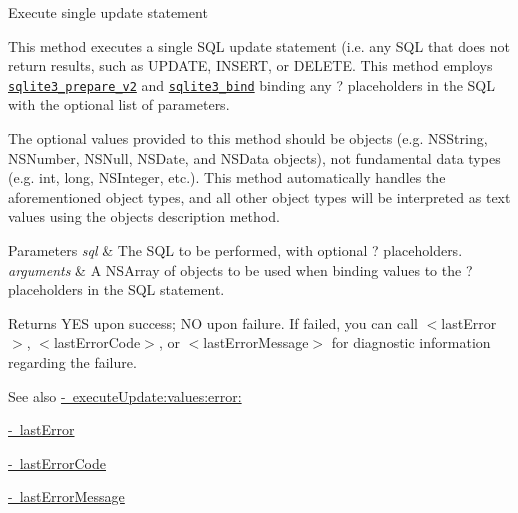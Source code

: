 Execute single update statement

This method executes a single S\+QL update statement (i.\+e. any S\+QL that does not return results, such as {\ttfamily U\+P\+D\+A\+TE}, {\ttfamily I\+N\+S\+E\+RT}, or {\ttfamily D\+E\+L\+E\+TE}. This method employs \href{http://sqlite.org/c3ref/prepare.html}{\tt {\ttfamily sqlite3\+\_\+prepare\+\_\+v2}} and \href{http://sqlite.org/c3ref/bind_blob.html}{\tt {\ttfamily sqlite3\+\_\+bind}} binding any {\ttfamily ?} placeholders in the S\+QL with the optional list of parameters.

The optional values provided to this method should be objects (e.\+g. {\ttfamily N\+S\+String}, {\ttfamily N\+S\+Number}, {\ttfamily N\+S\+Null}, {\ttfamily N\+S\+Date}, and {\ttfamily N\+S\+Data} objects), not fundamental data types (e.\+g. {\ttfamily int}, {\ttfamily long}, {\ttfamily N\+S\+Integer}, etc.). This method automatically handles the aforementioned object types, and all other object types will be interpreted as text values using the object\textquotesingle{}s {\ttfamily description} method.


\begin{DoxyParams}{Parameters}
{\em sql} & The S\+QL to be performed, with optional {\ttfamily ?} placeholders.\\
\hline
{\em arguments} & A {\ttfamily N\+S\+Array} of objects to be used when binding values to the {\ttfamily ?} placeholders in the S\+QL statement.\\
\hline
\end{DoxyParams}
\begin{DoxyReturn}{Returns}
{\ttfamily Y\+ES} upon success; {\ttfamily NO} upon failure. If failed, you can call {\ttfamily $<$last\+Error$>$}, {\ttfamily $<$last\+Error\+Code$>$}, or {\ttfamily $<$last\+Error\+Message$>$} for diagnostic information regarding the failure.
\end{DoxyReturn}
\begin{DoxySeeAlso}{See also}
\mbox{\hyperlink{interface_o_p_t_l_y_f_m_d_b_database_a0d75e3c094f6e03946a5b8278a215c42}{-\/ execute\+Update\+:values\+:error\+:}} 

\mbox{\hyperlink{interface_o_p_t_l_y_f_m_d_b_database_a477a6ff4d9daaac53a56c0a058a0d2f7}{-\/ last\+Error}} 

\mbox{\hyperlink{interface_o_p_t_l_y_f_m_d_b_database_a9f15cf87d3c764783ce0c6beb39393a9}{-\/ last\+Error\+Code}} 

\mbox{\hyperlink{interface_o_p_t_l_y_f_m_d_b_database_a082c5d58576df07956308656064e1f63}{-\/ last\+Error\+Message}} 
\end{DoxySeeAlso}
\mbox{\label{interface_o_p_t_l_y_f_m_d_b_database_a1281526ad6641e7ef2198c3e9d971754}} 
